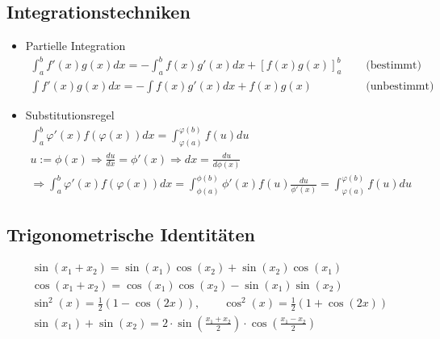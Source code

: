 \documentclass[a4paper]{article}
\begin{document}
\subsection{Integrationstechniken}
\begin{itemize}
	\item Partielle Integration
		\begin{align*}
			\int_{a}^{b} f' (x) g(x) dx
			= - \int_{a}^{b} f(x) g' (x) dx 
			+ \left[
				f(x) g(x)
			\right]_a^b \quad & \text{ (bestimmt) } \\
			\int f'(x) g(x) dx = - \int f(x) g'(x) dx
			+ f(x) g(x) \quad & \text{ (unbestimmt) }
		\end{align*}
	\item Substitutionsregel
		\begin{gather*}
			\int_{a}^{b} \varphi' (x) f( \varphi(x) ) dx
			=
			\int_{\varphi(a)}^{\varphi(b)} f(u) du \\
				u := \phi (x)
				\Rightarrow \frac{ du }{ dx } = \phi' (x)
				\Rightarrow dx = \frac{ du }{ d \phi(x) } \\
				\Rightarrow
				\int_{a}^{b} \varphi' (x) f( \varphi(x) ) dx
				 = \int_{\phi (a)}^{\phi(b)} \phi' (x) f(u)
				\frac{ du }{ \phi' (x) } 
				 = \int_{\varphi(a)}^{\varphi(b)} f(u) du
		\end{gather*}
\end{itemize}

\subsection{Trigonometrische Identitäten}
\begin{gather}
	\sin (x_1 + x_2) =
	\sin (x_1) \cos (x_2) + 
	\sin (x_2) \cos (x_1) \\
	\cos (x_1 + x_2) = 
	\cos (x_1) \cos(x_2) - 
	\sin (x_1) \sin(x_2) \\
	\sin ^2 (x) = \frac{ 1 }{ 2 } \left(
		1 - \cos (2x)
	\right), \qquad
	\cos ^2 (x) = \frac{ 1 }{ 2 } \left(
		1 + \cos (2x)
	\right) \\
	\sin (x_1) + \sin (x_2)
	= 2 \cdot \sin \left(
		\frac{ x_1 + x_2 }{ 2 }
	\right) \cdot \cos \left(
		\frac{ x_1 - x_2 }{ 2 }
	\right) 
\end{gather}
\end{document}
